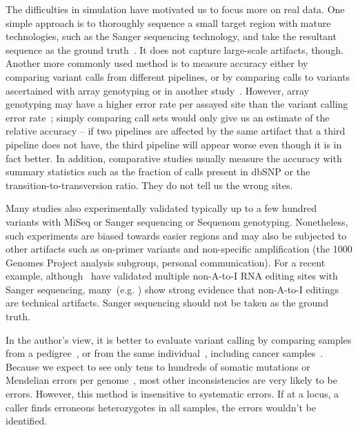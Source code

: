 \documentclass{bioinfo}
\begin{document}
The difficulties in simulation have motivated us to focus more on real data. One
simple approach is to thoroughly sequence a small target region with mature
technologies, such as the Sanger sequencing technology, and take the resultant sequence as
the ground truth~\citep{Harismendy:2009aa}. It does not capture large-scale
artifacts, though. Another more commonly used method is to measure accuracy
either by comparing variant calls from different pipelines, or by comparing
calls to variants ascertained with array genotyping or in another
study~\citep{Clark:2011aa,Li:2012fk,Lam:2012aa,Lam:2012fk,Boland:2013aa,Liu:2013aa,Goode:2013aa,ORawe:2013aa,Zook:2014aa}.
However, array genotyping may have a higher error rate per assayed site than
the variant calling error rate~\citep{Bentley:2008cr}; simply comparing call
sets would only give us an estimate of the relative accuracy -- if two
pipelines are affected by the same artifact that a third pipeline does
not have, the third pipeline will appear worse even though it is in fact
better.  In addition, comparative studies usually measure the accuracy with
summary statistics such as the fraction of calls present in dbSNP or the
transition-to-transversion ratio.  They do not tell us the wrong sites.

Many studies also experimentally validated typically up to a few hundred
variants with MiSeq or Sanger sequencing or Sequenom genotyping. Nonetheless,
such experiments are biased towards easier regions and may also be subjected
to other artifacts such as on-primer variants and non-specific amplification
(the 1000 Genomes Project analysis subgroup, personal communication). For a
recent example, although~\citet{Li:2011ac} have validated multiple \mbox{non-A-to-I}
RNA editing sites with Sanger sequencing, many~(e.g. ) show
strong evidence that \mbox{non-A-to-I} editings are technical artifacts. Sanger
sequencing should not be taken as the ground truth.

In the author's view, it is better to evaluate variant calling by
comparing samples from a pedigree~\citep{Zook:2014aa}, or from the same
individual~\citep{Nickles:2012aa}, including cancer
samples~\citep{Lower:2012aa}. Because we expect to see only tens to hundreds of
somatic mutations or Mendelian errors per genome~\citep{Conrad:2011kx}, most other inconsistencies
are very likely to be errors. However, this method is insensitive to systematic
errors.  If at a locus, a caller finds erroneous heterozygotes in all samples,
the errors wouldn't be identified.
\end{document}

